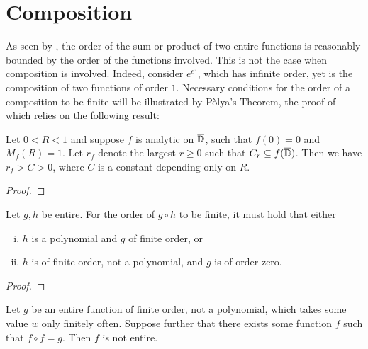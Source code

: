 \section{Composition}
\label{seq:composition}

As seen by , the order of the sum or product of two entire functions is reasonably bounded by the order of the functions involved. This is not the case when composition is involved. Indeed, consider $e^{e^z}$, which has infinite order, yet is the composition of two functions of order $1$. Necessary conditions for the order of a composition to be finite will be illustrated by Pòlya's Theorem, the proof of which relies on the following result:

\begin{lemma}[Bohr]
    Let $0 < R < 1$ and suppose $f$ is analytic on $\overline{\mathbb{D}}$, such that $f(0) = 0$ and $M_f(R) = 1$. Let $r_f$ denote the largest $r \geq 0$ such that $C_r \subseteq f(\overline{\mathbb{D}})$. Then we have $r_f > C > 0$, where $C$ is a constant depending only on $R$.
\end{lemma}

\begin{proof}
\end{proof}

\begin{theorem}[Pólya] \label{thm:polya}
    Let $g, h$ be entire. For the order of $g \circ h$ to be finite, it must hold that either
    \begin{enumerate}[i.]
        \item $h$ is a polynomial and $g$ of finite order, or
        \item $h$ is of finite order, not a polynomial, and $g$ is of order zero.
    \end{enumerate}
\end{theorem}

\begin{proof}
\end{proof}

\begin{theorem}[Thron] \label{thm:thron}
    Let $g$ be an entire function of finite order, not a polynomial, which takes some value $w$ only finitely often. Suppose further that there exists some function $f$ such that $f \circ f = g$. Then $f$ is not entire.
\end{theorem}

